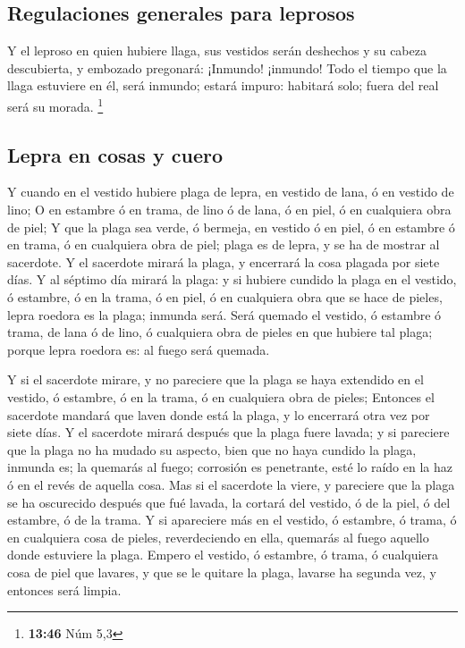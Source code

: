 \hypertarget{regulaciones-generales-para-leprosos}{%
\subsection{Regulaciones generales para
leprosos}\label{regulaciones-generales-para-leprosos}}

 Y el leproso en quien hubiere llaga, sus vestidos serán
deshechos y su cabeza descubierta, y embozado pregonará: ¡Inmundo!
¡inmundo!  Todo el tiempo que la llaga estuviere en él,
será inmundo; estará impuro: habitará solo; fuera del real será su
morada. \footnote{\textbf{13:46} Núm 5,3}

\hypertarget{lepra-en-cosas-y-cuero}{%
\subsection{Lepra en cosas y cuero}\label{lepra-en-cosas-y-cuero}}

 Y cuando en el vestido hubiere plaga de lepra, en vestido
de lana, ó en vestido de lino;  O en estambre ó en trama,
de lino ó de lana, ó en piel, ó en cualquiera obra de piel;
 Y que la plaga sea verde, ó bermeja, en vestido ó en piel,
ó en estambre ó en trama, ó en cualquiera obra de piel; plaga es de
lepra, y se ha de mostrar al sacerdote.  Y el sacerdote
mirará la plaga, y encerrará la cosa plagada por siete días.
 Y al séptimo día mirará la plaga: y si hubiere cundido la
plaga en el vestido, ó estambre, ó en la trama, ó en piel, ó en
cualquiera obra que se hace de pieles, lepra roedora es la plaga;
inmunda será.  Será quemado el vestido, ó estambre ó trama,
de lana ó de lino, ó cualquiera obra de pieles en que hubiere tal plaga;
porque lepra roedora es: al fuego será quemada.

 Y si el sacerdote mirare, y no pareciere que la plaga se
haya extendido en el vestido, ó estambre, ó en la trama, ó en cualquiera
obra de pieles;  Entonces el sacerdote mandará que laven
donde está la plaga, y lo encerrará otra vez por siete días.
 Y el sacerdote mirará después que la plaga fuere lavada; y
si pareciere que la plaga no ha mudado su aspecto, bien que no haya
cundido la plaga, inmunda es; la quemarás al fuego; corrosión es
penetrante, esté lo raído en la haz ó en el revés de aquella cosa.
 Mas si el sacerdote la viere, y pareciere que la plaga se
ha oscurecido después que fué lavada, la cortará del vestido, ó de la
piel, ó del estambre, ó de la trama.  Y si apareciere más
en el vestido, ó estambre, ó trama, ó en cualquiera cosa de pieles,
reverdeciendo en ella, quemarás al fuego aquello donde estuviere la
plaga.  Empero el vestido, ó estambre, ó trama, ó
cualquiera cosa de piel que lavares, y que se le quitare la plaga,
lavarse ha segunda vez, y entonces será limpia.

